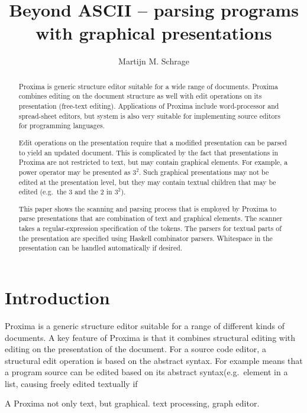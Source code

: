 \documentclass[12pt]{article}
\title{Beyond ASCII -- parsing programs with graphical presentations \\{\small \version}}
\author{Martijn M. Schrage\inst{1}}
\begin{document}
 

\maketitle

\begin{abstract}

Proxima is generic structure editor suitable for a wide range of documents. Proxima combines editing on the document structure as well with edit operations on its presentation (free-text editing). Applications of Proxima include word-processor and spread-sheet editors, but system is also very suitable for implementing source editors for programming languages.

Edit operations on the presentation require that a modified presentation can be parsed to yield an updated document. This is complicated by the fact that presentations in Proxima are not restricted to text, but may contain graphical elements. For example, a power operator may be presented as $3^2$. Such graphical presentations may not be edited at the presentation level, but they may contain textual children that may be edited (e.g.\ the 3 and the 2 in $3^2$). 

This paper shows the scanning and parsing process that is employed by Proxima to parse presentations that are combination of text and graphical elements. The scanner takes a regular-expression specification of the tokens. The parsers for textual parts of the presentation are specified using Haskell combinator parsers. Whitespace in the presentation can be handled automatically if desired.

\end{abstract}
     
\section{Introduction}

Proxima is a generic structure editor suitable for a range of different kinds of documents. A key feature of Proxima is that it combines structural editing with editing on the presentation of the document. For a source code editor, a structural edit operation is based on the abstract syntax. For example means that a program source can be edited based on its abstract syntax(e.g.\ element in a list, causing freely edited textually if 

A Proxima not only text, but graphical. text processing, graph editor.
\end{document}
